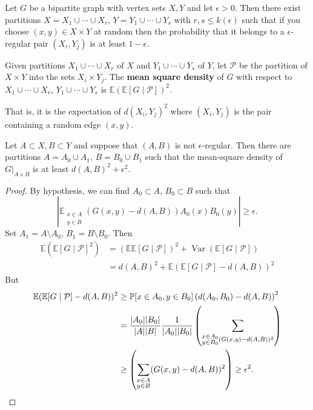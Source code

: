 \documentclass{article}
\newcommand{\1}[1]{\mathbbm{1}_{#1}}
\DeclareMathOperator{\Var}{Var}
\begin{document}
\begin{nthm}\label{thm:3.8}
  Let $G$ be a bipartite graph with vertex sets $X,Y$ and let $\epsilon > 0$.
  Then there exist partitions $X = X_1 \cup \dotsb \cup X_r$, $Y = Y_1 \cup \dotsb \cup Y_s$ with $r,s \leq k(\epsilon)$ such that if you choose $(x,y) \in X \times Y$ at random then the probability that it belongs to a $\epsilon$-regular pair $(X_i,Y_j)$ is at least $1-\epsilon$.
\end{nthm}
\begin{defi}
  Given partitions $X_1 \cup \dotsb \cup X_r$ of $X$ and $Y_1 \cup \dotsb \cup Y_s$ of $Y$, let $\mathcal{P}$ be the partition of $X \times Y$ into the sets $X_i \times Y_j$.
  The \textbf{mean square density} of $G$ with respect to $X_1 \cup \dotsb \cup X_r$, $Y_1 \cup \dotsb \cup Y_s$ is $\mathbb{E} (\mathbb{E} [G \mid \mathcal{P}])^2$.
\end{defi}
That is, it is the expectation of $d(X_i, Y_j)^2$ where $(X_i, Y_j)$ is the pair containing a random edge $(x,y)$.
\begin{nlemma}\label{lem:3.9}
  Let $A \subset X, B \subset Y$ and suppose that $(A,B)$ is not $\epsilon$-regular.
  Then there are partitions $A = A_0 \cup A_1$, $B = B_0 \cup B_1$ such that the mean-square density of $G|_{A \times B}$ is at least $d(A,B)^2 + \epsilon^2$.
\end{nlemma}
\begin{proof}
  By hypothesis, we can find $A_0 \subset A$, $B_0 \subset B$ such that
  \begin{equation*}
    \left\lvert \mathbb{E}_{\substack{x \in A \\ y \in B}} (G(x,y) - d(A,B)) A_0(x) B_0(y) \right\rvert \geq \epsilon.
  \end{equation*}
  Set $A_1 = A \setminus A_0$, $B_1 = B \setminus B_0$. Then
  \begin{align*}
    \mathbb{E} (\mathbb{E}[G \mid \mathcal{P}]^2) &= (\mathbb{E} \mathbb{E} [G \mid \mathcal{P}])^2 + \Var(\mathbb{E}[G \mid \mathcal{P}]) \\
                                                  &= d(A,B)^2 + \mathbb{E}(\mathbb{E}[G \mid \mathcal{P}] - d(A,B))^2
  \end{align*}
  But
  \begin{align*}
    \mathbb{E}(\mathbb{E}[G \mid \mathcal{P}] - d(A,B))^2 &\geq \mathbb{P}[x \in A_0, y \in B_0]\left(d(A_0,B_0) - d(A,B)\right)^2 \\
                                                          &= \frac{|A_0||B_0|}{|A||B|} \frac{1}{|A_0||B_0|}\left( \sum_{\substack{x \in A_0 \\ y \in B_0} (G(x,y) - d(A,B))^2} \right) \\
                                                          &\geq \left(\sum_{\substack{x \in A \\ y \in B}} (G(x,y) - d(A,B))^2 \right) \geq \epsilon^2. \qedhere
  \end{align*}
\end{proof}
\end{document}
